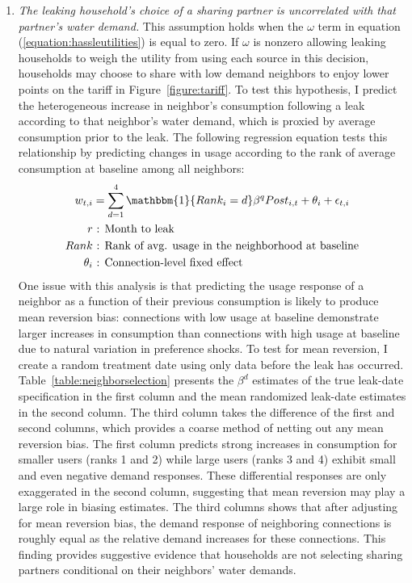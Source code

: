 \documentclass[12pt]{article}
\begin{document}
\begin{appendices}
\begin{enumerate}
	\item \textit{  The leaking household's choice of a sharing partner is uncorrelated with that partner's water demand.  }  This assumption holds when the $\omega$ term in equation (\ref{equation:hassleutilities}) is equal to zero.  If $\omega$ is nonzero allowing leaking households to weigh the utility from using each source in this decision, households may choose to share with low demand neighbors to enjoy lower points on the tariff in Figure~\ref{figure:tariff}.  To test this hypothesis, I predict the heterogeneous increase in neighbor's consumption following a leak according to that neighbor's water demand, which is proxied by average consumption prior to the leak.  The following regression equation tests this relationship by predicting changes in usage according to the rank of average consumption at baseline among all neighbors: 
\begin{align*}
	w_{t,i} &= \sum_{d=1}^{4} \mathbbm{1}\{Rank_{i}=d\}  \beta^{q} Post_{i,t}  + \theta_{i}  + \epsilon_{t,i}\\
r &\text{ : Month to leak} \\
Rank &\text{ : Rank of avg. usage in the neighborhood at baseline} \\
\theta_i &\text{ : Connection-level fixed effect}
\end{align*}
	One issue with this analysis is that predicting the usage response of a neighbor as a function of their previous consumption is likely to produce mean reversion bias: connections with low usage at baseline demonstrate larger increases in consumption than connections with high usage at baseline due to natural variation in preference shocks.  To test for mean reversion, I create a random treatment date using only data before the leak has occurred.  Table~\ref{table:neighborselection} presents the $\beta^{d}$ estimates of the true leak-date specification in the first column and the mean randomized leak-date estimates in the second column.  The third column takes the difference of the first and second columns, which provides a coarse method of netting out any mean reversion bias.  The first column predicts strong increases in consumption for smaller users (ranks 1 and 2) while large users (ranks 3 and 4) exhibit small and even negative demand responses.  These differential responses are only exaggerated in the second column, suggesting that mean reversion may play a large role in biasing estimates.  The third columns shows that after adjusting for mean reversion bias, the demand response of neighboring connections is roughly equal as the relative demand increases for these connections.  This finding provides suggestive evidence that households are not selecting sharing partners conditional on their neighbors' water demands.

\end{enumerate}
\end{appendices}
\end{document}

